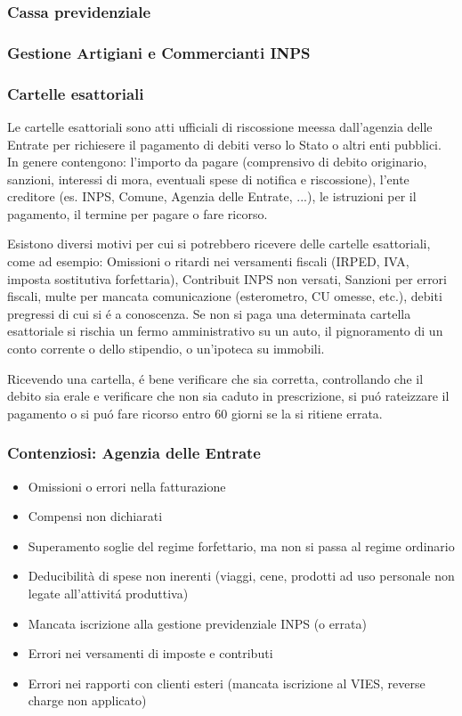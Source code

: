 \documentclass{article}
\begin{document}
\subsubsection{Cassa previdenziale}
\subsubsection{Gestione Artigiani e Commercianti INPS}

\subsubsection{Cartelle esattoriali}
Le cartelle esattoriali sono atti ufficiali di riscossione meessa dall'agenzia delle Entrate per richiesere il pagamento di debiti verso lo Stato o altri enti pubblici. In genere contengono: l'importo da pagare (comprensivo di debito originario, sanzioni, interessi di mora, eventuali spese di notifica e riscossione), l'ente creditore (es. INPS, Comune, Agenzia delle Entrate, ...), le istruzioni per il pagamento, il termine per pagare o fare ricorso. 

Esistono diversi motivi per cui si potrebbero ricevere delle cartelle esattoriali, come ad esempio: Omissioni o ritardi nei versamenti fiscali (IRPED, IVA, imposta sostitutiva forfettaria), Contribuit INPS non versati, Sanzioni per errori fiscali, multe per mancata comunicazione (esterometro, CU omesse, etc.), debiti pregressi di cui si \'e a conoscenza. Se non si paga una determinata cartella esattoriale si rischia un fermo amministrativo su un auto, il pignoramento di un conto corrente o dello stipendio, o un'ipoteca su immobili. 

Ricevendo una cartella, \'e bene verificare che sia corretta, controllando che il debito sia erale e verificare che non sia caduto in prescrizione, si pu\'o rateizzare il pagamento o si pu\'o fare ricorso entro 60 giorni se la si ritiene errata. 

\subsubsection{Contenziosi: Agenzia delle Entrate}
\begin{itemize}
    \item Omissioni o errori nella fatturazione
    \item Compensi non dichiarati
    \item Superamento soglie del regime forfettario, ma non si passa al regime ordinario
    \item Deducibilità di spese non inerenti (viaggi, cene, prodotti ad uso personale non legate all'attivit\'a produttiva)
    \item Mancata iscrizione alla gestione previdenziale INPS (o errata)
    \item Errori nei versamenti di imposte e contributi
    \item Errori nei rapporti con clienti esteri (mancata iscrizione al VIES, reverse charge non applicato)
\end{itemize}
\end{document}
